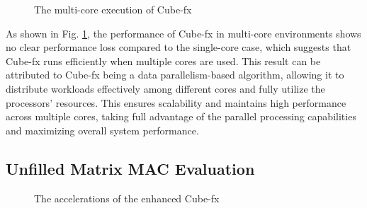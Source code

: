 \begin{figure}[tbp]
    \caption{The multi-core execution of Cube-fx}
    \label{fig:multi}
    \end{figure}

As shown in Fig. \ref{fig:multi}, the performance of Cube-fx in multi-core environments shows no clear performance loss compared to the single-core case, which suggests that Cube-fx runs efficiently when multiple cores are used. This result can be attributed to Cube-fx being a data parallelism-based algorithm, allowing it to distribute workloads effectively among different cores and fully utilize the processors' resources. This ensures scalability and maintains high performance across multiple cores, taking full advantage of the parallel processing capabilities and maximizing overall system performance.

\subsection{Unfilled Matrix MAC Evaluation}

\begin{figure}[tbp]
    \caption{The accelerations of the enhanced Cube-fx}
    \label{fig:results}
    \end{figure}

